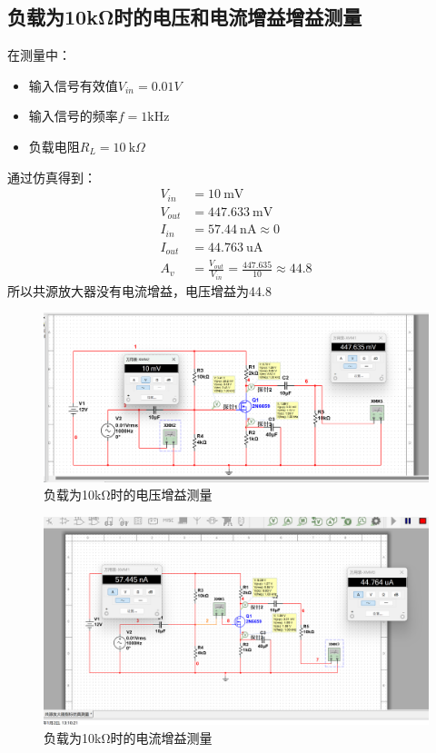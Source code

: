 \documentclass[12p,UTF8]{article}
\begin{document}
\begin{spacing}{1.25}
\subsection{负载为10kΩ时的电压和电流增益增益测量}
在测量中：
\begin{itemize}
  \item 输入信号有效值$V_{in} =0.01 {V}$
  \item 输入信号的频率$f=1\text{kHz}$
  \item 负载电阻$R_L = 10\ \text{k}\Omega$
\end{itemize}

通过仿真得到：
\begin{align*}
  V_{in}  &=10\ \text{mV} \\
  V_{out} &= 447.633\ \text{mV} \\
  I_{in}  &= 57.44\ \text{nA} \approx 0 \\
  I_{out} &= 44.763\ \text{uA} \\
  A_v &= \frac{V_{out}}{V_{in}} = \frac{447.635}{10} \approx 44.8 
\end{align*}
所以共源放大器没有电流增益，电压增益为44.8
\begin{figure}[H]
  \centering
  \includegraphics[width=1\linewidth]{2.png}
  \caption{负载为10kΩ时的电压增益测量}
  \label{fig:circuit}
\end{figure}
\begin{figure}[H]
  \centering
  \includegraphics[width=1\linewidth]{3.png}
  \caption{负载为10kΩ时的电流增益测量}
  \label{fig:circuit}
\end{figure}


\end{spacing}
\end{document}
